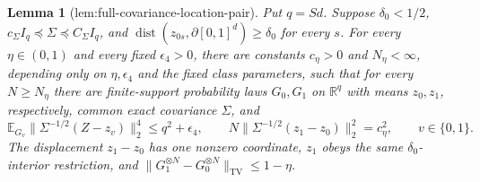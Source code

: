 \documentclass{article}
\newtheorem{lemma}{Lemma}
\begin{document}
\begin{lemma}[lem:full-covariance-location-pair]\label{lem:full-covariance-location-pair}
Put \(q=Sd\).  Suppose \(\delta_0<1/2\),
\(c_\Sigma I_q\preceq\Sigma\preceq C_\Sigma I_q\), and
\(\operatorname{dist}(z_{0s},\partial[0,1]^d)\ge\delta_0\) for every \(s\).
For every \(\eta\in(0,1)\) and every fixed \(\epsilon_4>0\), there are
constants \(c_\eta>0\) and \(N_\eta<\infty\), depending only on
\(\eta,\epsilon_4\) and the fixed class parameters, such that for every
\(N\ge N_\eta\) there are finite-support probability laws \(G_0,G_1\) on
\(\mathbb R^q\) with means \(z_0,z_1\), respectively, common exact
covariance \(\Sigma\), and
\[
 \mathbb E_{G_v}\|\Sigma^{-1/2}(Z-z_v)\|_2^4\le q^2+\epsilon_4,
 \qquad
 N\|\Sigma^{-1/2}(z_1-z_0)\|_2^2=c_\eta^2,
 \qquad v\in\{0,1\}.
\]
The displacement \(z_1-z_0\) has one nonzero coordinate, \(z_1\) obeys the
same \(\delta_0\)-interior restriction, and
\(\|G_1^{\otimes N}-G_0^{\otimes N}\|_{\mathrm{TV}}\le1-\eta\).
\end{lemma}
\end{document}
